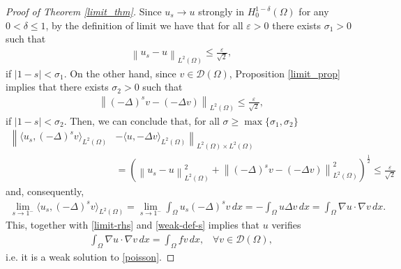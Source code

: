 \documentclass[reqno,twoside]{amsart}
\numberwithin{equation}{section}
\newcommand{\norm}[2]{{\left\|#1\right\|}_{#2}}
\newcommand{\fl}[2]{(-\Delta)^#1#2}
\newcommand{\rouge}[1]{{\color{red}#1}}
\begin{document}
\begin{proof}[Proof of Theorem \ref{limit_thm}]
\rouge{ 
Since $u_s\to u$ strongly in $H^{1-\delta}_0(\Omega)$ for any $0<\delta\leq 1$, by the definition of limit we have that for all $\varepsilon>0$ there exists $\sigma_1>0$ such that 
\begin{align*}
	\norm{u_s-u}{L^2(\Omega)}\leq \frac{\varepsilon}{\sqrt{2}},
\end{align*}
if $|1-s|<\sigma_1$. On the other hand, since $v\in\mathcal{D}(\Omega)$, Proposition \ref{limit_prop} implies that there exists $\sigma_2>0$ such that 
\begin{align*}
	\norm{\fl{s}{v}- (-\Delta v)}{L^2(\Omega)}\leq \frac{\varepsilon}{\sqrt{2}},
\end{align*}
if $|1-s|<\sigma_2$. Then, we can conclude that, for all $\sigma\geq\max\{\sigma_1,\sigma_2\}$  
\begin{align*}
	\left\|\langle u_s,\fl{s}{v}\rangle_{L^2(\Omega)}\right. &-\left.\langle u,-\Delta v\rangle_{L^2(\Omega)}\right\|_{L^2(\Omega)\times L^2(\Omega)} 
	\\
	& = \left(\norm{u_s-u}{L^2(\Omega)}^2 + \norm{\fl{s}{v}-(-\Delta v)}{L^2(\Omega)}^2\right)^{\frac 12} \leq \frac{\varepsilon}{\sqrt{2}}
\end{align*}
and, consequently,
}
\begin{align*}
	\lim_{s\to 1^-} \big\langle u_s,\fl{s}{v}\big\rangle_{L^2(\Omega)} = \lim_{s\to 1^-} \int_\Omega u_s\fl{s}{v}\,dx = -\int_\Omega u\Delta v\,dx = \int_\Omega \nabla u\cdot\nabla v\,dx.
\end{align*}
This, together with \eqref{limit-rhs} and \eqref{weak-def-s} implies that $u$ verifies
\begin{align*}
	\int_\Omega \nabla u\cdot\nabla v\,dx = \int_{\Omega} fv\,dx, \;\;\; \forall v\in\mathcal{D}(\Omega),
\end{align*}
i.e. it is a weak solution to \eqref{poisson}.
\end{proof}
\end{document}
